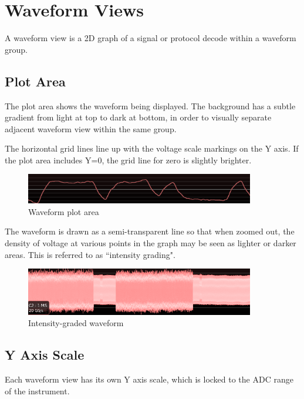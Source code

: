 \chapter{Waveform Views}

A waveform view is a 2D graph of a signal or protocol decode within a waveform group.

\section{Plot Area}

The plot area shows the waveform being displayed. The background has a subtle gradient from light at top to dark at
bottom, in order to visually separate adjacent waveform view within the same group.

The horizontal grid lines line up with the voltage scale markings on the Y axis. If the plot area includes Y=0, the
grid line for zero is slightly brighter.

\begin{figure}[H]
\centering
\includegraphics[width=10cm]{images/waveform-graph.png}
\caption{Waveform plot area}
\label{waveform-graph}
\end{figure}

The waveform is drawn as a semi-transparent line so that when zoomed out, the density of voltage at various points in
the graph may be seen as lighter or darker areas. This is referred to as ``intensity grading".

\begin{figure}[H]
\centering
\includegraphics[width=10cm]{images/graded-waveform.png}
\caption{Intensity-graded waveform}
\label{graded-waveform2}
\end{figure}

\section{Y Axis Scale}

Each waveform view has its own Y axis scale, which is locked to the ADC range of the instrument.

